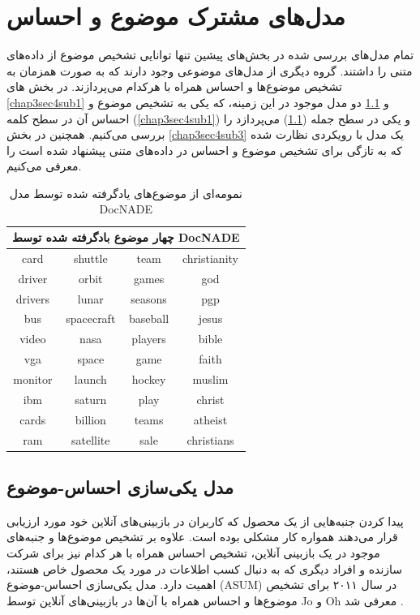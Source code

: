 \section{مدل‌های مشترک موضوع و احساس}
تمام مدل‌های بررسی‌ شده در بخش‌های پیشین تنها توانایی تشخیص موضوع از داده‌های متنی را داشتند. گروه دیگری از مدل‌های موضوعی وجود دارند که به صورت همزمان به تشخیص موضوع‌ها و احساس همراه با هرکدام می‌‌پردازند. در بخش های
\ref{chap3sec4sub1}
و
\ref{chap3sec4sub2}
دو مدل موجود در این زمینه، که یکی‌ به تشخیص موضوع و احساس آن در سطح کلمه
(\ref{chap3sec4sub1})
 و یکی‌ در سطح جمله
(\ref{chap3sec4sub2})
  می‌‌پردازد را بررسی‌ می‌‌کنیم. همچنین در بخش
\ref{chap3sec4sub3}
  یک مدل با رویکردی نظارت شده که به تازگی برای تشخیص موضوع و احساس در داده‌های متنی پیشنهاد شده است را معرفی‌ می‌‌کنیم.
  \begin{table}[!b]
	\centering
	\begin{tabular}{|c|c|c|c|}
		\hline
		\multicolumn{4}{|c|}{چهار موضوع بادگرفته شده توسط DocNADE}\\
		\hline
		card 	 & shuttle 		& team 	   & christianity\\
		driver 	 & orbit 		& games    & god\\
		drivers  & lunar 		& seasons  & pgp\\ 
		bus		 & spacecraft 	& baseball & jesus\\ 
		video	 & nasa  		& players  & bible\\ 
		vga		 & space 		& game     & faith\\ 
		monitor  & launch 		& hockey   & muslim\\ 
		ibm   	 & saturn  		& play 	   & christ\\ 
		cards	 & billion		& teams    & atheist\\
		ram    	 & satellite	& sale     & christians\\
		\hline
	\end{tabular}
	\caption{نمومه‌ای از موضوع‌های یادگرفته شده توسط مدل DocNADE \cite{larochelle2012neural}}
	\label{chap3-tb1}
\end{table}

	\subsection{مدل یکی‌سازی احساس-موضوع}
	\label{chap3sec4sub2}
	
	پیدا کردن جنبه‌هایی از یک محصول که کاربران در بازبینی‌های آنلاین خود مورد ارزیابی قرار می‌‌دهند همواره کار مشکلی‌ بوده است. علاوه بر تشخیص موضوع‌ها و جنبه‌های موجود در یک بازبینی آنلاین، تشخیص احساس همراه با هر کدام نیز برای شرکت سازنده و افراد دیگری که به دنبال کسب اطلاعات در مورد یک محصول خاص هستند، اهمیت دارد. مدل یکی‌سازی احساس-موضوع
	(ASUM)
	در سال ۲۰۱۱ برای تشخیص موضوع‌ها و احساس همراه با آن‌ها در بازبینی‌های آنلاین توسط
	Jo
	و
	Oh
	معرفی‌ شد
	\cite{jo2011aspect}.
	
